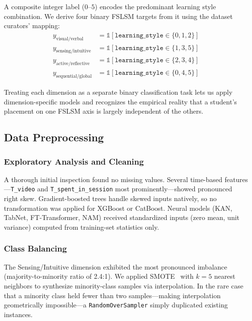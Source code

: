 \documentclass[journal, onecolumn]{IEEEtran}
\begin{document}
A composite integer label ($0$--$5$) encodes the predominant learning style combination. We derive four binary FSLSM targets from it using the dataset curators' mapping:
\begin{align}
    y_{\text{visual/verbal}} &= \mathbb{1}[\texttt{learning\_style} \in \{0,1,2\}] \\
    y_{\text{sensing/intuitive}} &= \mathbb{1}[\texttt{learning\_style} \in \{1,3,5\}] \\
    y_{\text{active/reflective}} &= \mathbb{1}[\texttt{learning\_style} \in \{2,3,4\}] \\
    y_{\text{sequential/global}} &= \mathbb{1}[\texttt{learning\_style} \in \{0,4,5\}]
\end{align}

Treating each dimension as a separate binary classification task lets us apply dimension-specific models and recognizes the empirical reality that a student's placement on one FSLSM axis is largely independent of the others.

\subsection{Data Preprocessing}

\subsubsection{Exploratory Analysis and Cleaning}
A thorough initial inspection found no missing values. Several time-based features---\texttt{T\_video} and \texttt{T\_spent\_in\_session} most prominently---showed pronounced right skew. Gradient-boosted trees handle skewed inputs natively, so no transformation was applied for XGBoost or CatBoost. Neural models (KAN, TabNet, FT-Transformer, NAM) received standardized inputs (zero mean, unit variance) computed from training-set statistics only.

\subsubsection{Class Balancing}
The Sensing/Intuitive dimension exhibited the most pronounced imbalance (majority-to-minority ratio of 2.4:1). We applied SMOTE~\cite{chawla2002smote} with $k=5$ nearest neighbors to synthesize minority-class samples via interpolation. In the rare case that a minority class held fewer than two samples---making interpolation geometrically impossible---a \texttt{RandomOverSampler} simply duplicated existing instances.
\end{document}
